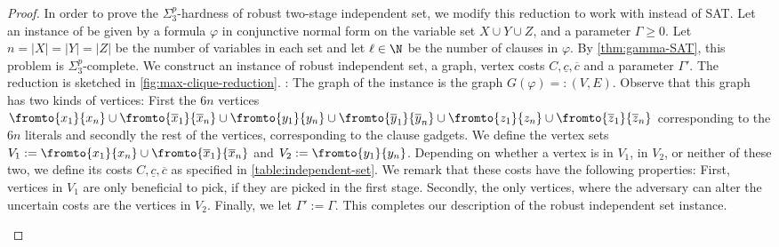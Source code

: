 \documentclass[a4paper,abstracton]{scrartcl}
\begin{document}
\begin{proof}
In order to prove the $\Sigma_3^p$-hardness of robust two-stage independent set, we modify this reduction to work with {\radj} instead of SAT. 
Let an instance of {\radj} be given by a formula $\varphi$ in conjunctive normal form on the variable set $X \cup Y \cup Z$, and a parameter $\Gamma \geq 0$. Let $n = |X| = |Y| = |Z|$ be the number of variables in each set and let $\ell \in \N$ be the number of clauses in $\varphi$. 
By \cref{thm:gamma-SAT}, this problem is $\Sigma_3^p$-complete. 
We construct an instance of robust independent set,  a graph, vertex costs $C, \underline{c}, \overline{c}$ and a parameter $\Gamma'$. The reduction is sketched in \cref{fig:max-clique-reduction}. :
The graph of the instance is the graph $G(\varphi) =: (V,E)$. 
Observe that this graph has two kinds of vertices: 
First the $6n$ vertices $\fromto{x_1}{x_n} \cup \fromto{\overline{x}_1}{\overline{x}_n} \cup \fromto{y_1}{y_n} \cup \fromto{\overline{y}_1}{\overline{y}_n} \cup \fromto{z_1}{z_n} \cup \fromto{\overline{z}_1}{\overline{z}_n}$ corresponding to the $6n$ literals and secondly the rest of the vertices, corresponding to the clause gadgets. 
We define the vertex sets $V_1 := \fromto{x_1}{x_n} \cup \fromto{\overline{x}_1}{\overline{x}_n}$ and $V_2 := \fromto{y_1}{y_n}$. 
Depending on whether a vertex is in $V_1$, in $V_2$, or neither of these two, we define its costs $C, \underline{c}, \overline{c}$ as specified in \cref{table:independent-set}. 
We remark that these costs have the following properties: First, vertices in $V_1$ are only beneficial to pick, if they are picked in the first stage. 
Secondly, the only vertices, where the adversary can alter the uncertain costs are the vertices in $V_2$.
Finally, we let $\Gamma' := \Gamma$. This completes our description of the robust independent set instance.
\begin{figure}[htpb]
\centering
{}
\end{figure}
\end{proof}
\end{document}
